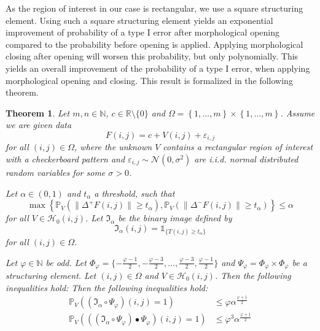 \documentclass[a4paper,12pt]{article}
\newcommand{\norm}[1]{\lVert#1\rVert}
\theoremstyle{plain}
\newtheorem{theorem}{Theorem}[section]
\theoremstyle{definition}
\begin{document}
As the region of interest in our case is rectangular, we use a square structuring element. Using such a square structuring element yields an exponential improvement of probability of a type I error after morphological opening compared to the probability before opening is applied. Applying morphological closing after opening will worsen this probability, but only polynomially. This yields an overall improvement of the probability of a type I error, when applying morphological opening and closing. This result is formalized in the following theorem.
\begin{theorem}
	Let $m, n \in \mathbb{N}$, $c \in \mathbb{R} \setminus \{ 0 \}$ and $\Omega = \left\{ 1, \dots, m \right\} \times \left\{ 1, \dots, m \right\}$. Assume we are given data
	\begin{equation*}
		F(i, j) = c + V(i, j) + \varepsilon_{i, j}
	\end{equation*}
	for all $(i, j) \in \Omega$, where the unknown $V$ contains a rectangular region of interest with a checkerboard pattern and $\varepsilon_{i, j} \sim \mathcal{N}(0, \sigma^2)$ are i.i.d. normal distributed random variables for some $\sigma > 0$.
	
	Let $\alpha \in (0, 1)$ and $t_\alpha$ a threshold, such that
	\begin{equation*}
		\max \left\{ \mathbb{P}_V\left( \norm{\Delta^+ F(i, j)} \geq t_\alpha \right), \mathbb{P}_V\left( \norm{\Delta^- F(i, j)} \geq t_\alpha \right) \right\} \leq \alpha
	\end{equation*}
	for all $V \in \mathcal{H}_0(i, j)$. Let $\mathfrak{I}_\alpha$ be the binary image defined by
	\begin{equation*}
		\mathfrak{I}_\alpha(i, j) = \mathds{1}_{ \{ T(i, j) \geq t_\alpha \} }
	\end{equation*}
	for all $(i, j) \in \Omega$.
	
	Let $\varphi \in \mathbb{N}$ be odd. Let $\Phi_\varphi = \{ -\frac{\varphi - 1}{2}, -\frac{\varphi - 3}{2}, \dots, \frac{\varphi - 3}{2}, \frac{\varphi - 1}{2} \}$ and $\Psi_\varphi = \Phi_\varphi \times \Phi_\varphi$ be a structuring element. Let $(i, j) \in \Omega$ and $V \in \mathcal{H}_0(i, j)$.
	Then the following inequalities hold:
	Then the following inequalities hold:
	\begin{align}
		\mathbb{P}_V( (\mathfrak{I}_\alpha \circ \Psi_\varphi)(i, j) = 1 ) &\leq \varphi \alpha^{\frac{\varphi + 1}{2}} \\
		\mathbb{P}_V( ((\mathfrak{I}_\alpha \circ \Psi_\varphi) \bullet \Psi_\varphi)(i, j) = 1 ) &\leq \varphi^3 \alpha^{\frac{\varphi + 1}{2}}
	\end{align}
\end{theorem}
\end{document}
